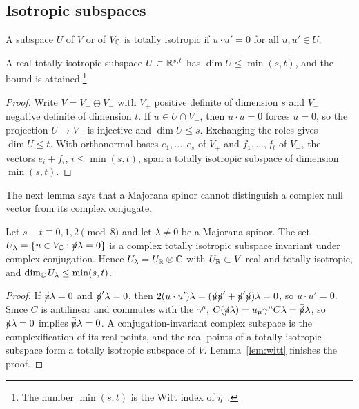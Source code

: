 \subsection{Isotropic subspaces}

A subspace $U$ of $V$ or of $V_{\mathbb{C}}$ is totally isotropic if $u\cdot u'=0$ for all $u,u'\in U$.

\begin{lemma}
\label{lem:witt}
A real totally isotropic subspace $U\subset\mathbb{R}^{s,t}$ has $\dim U\le\min(s,t)$, and the bound is attained.\footnote{The number $\min(s,t)$ is the Witt index of $\eta$~\cite{Witt1937,Lam2005}.}
\end{lemma}

\begin{proof}
Write $V=V_+\oplus V_-$ with $V_+$ positive definite of dimension $s$ and $V_-$ negative definite of dimension $t$. If $u\in U\cap V_-$, then $u\cdot u=0$ forces $u=0$, so the projection $U\to V_+$ is injective and $\dim U\le s$. Exchanging the roles gives $\dim U\le t$. With orthonormal bases $e_1,\dots,e_s$ of $V_+$ and $f_1,\dots,f_t$ of $V_-$, the vectors $e_i+f_i$, $i\le\min(s,t)$, span a totally isotropic subspace of dimension $\min(s,t)$.
\end{proof}

The next lemma says that a Majorana spinor cannot distinguish a complex null vector from its complex conjugate.

\begin{lemma}
\label{lem:reality}
Let $s-t\equiv0,1,2\pmod 8$ and let $\lambda\ne0$ be a Majorana spinor. The set $U_\lambda=\{u\in V_{\mathbb{C}}:\slashed{u}\lambda=0\}$ is a complex totally isotropic subspace invariant under complex conjugation. Hence $U_\lambda=U_{\mathbb{R}}\otimes\mathbb{C}$ with $U_{\mathbb{R}}\subset V$ real and totally isotropic, and $\dim_{\mathbb{C}} U_\lambda\le\min(s,t)$.
\end{lemma}

\begin{proof}
If $\slashed{u}\lambda=0$ and $\slashed{u}'\lambda=0$, then $2(u\cdot u')\lambda=(\slashed{u}\slashed{u}'+\slashed{u}'\slashed{u})\lambda=0$, so $u\cdot u'=0$. Since $C$ is antilinear and commutes with the $\gamma^\mu$, $C(\slashed{u}\lambda)=\bar u_\mu\gamma^\mu C\lambda=\bar{\slashed{u}}\lambda$, so $\slashed{u}\lambda=0$ implies $\bar{\slashed{u}}\lambda=0$. A conjugation-invariant complex subspace is the complexification of its real points, and the real points of a totally isotropic subspace form a totally isotropic subspace of $V$. Lemma~\ref{lem:witt} finishes the proof.
\end{proof}

